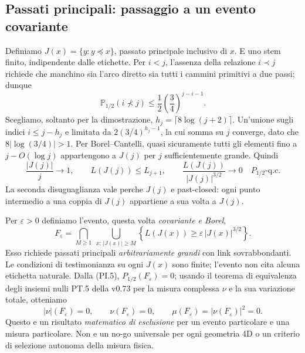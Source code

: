 \documentclass[11pt,a4paper]{article}
\begin{document}
\clearpage
\subsection*{Passati principali: passaggio a un evento covariante}
Definiamo $J(x)=\{y:y\preceq x\}$, passato principale inclusivo di $x$. E uno stem finito, indipendente dalle etichette. Per $i<j$, l'assenza della relazione $i\prec j$ richiede che manchino sia l'arco diretto sia tutti i cammini primitivi a due passi; dunque
\begin{equation}
\mathbb P_{1/2}(i\not\prec j)\le\frac12\left(\frac34\right)^{j-i-1}.
\tag{PI.4}
\end{equation}
Scegliamo, soltanto per la dimostrazione, $h_j=\lceil8\log(j+2)\rceil$. Un'unione sugli indici $i\le j-h_j$ e limitata da $2(3/4)^{h_j-1}$, la cui somma su $j$ converge, dato che $8|\log(3/4)|>1$. Per Borel--Cantelli, quasi sicuramente tutti gli elementi fino a $j-O(\log j)$ appartengono a $J(j)$ per $j$ sufficientemente grande. Quindi
\begin{equation}
\frac{|J(j)|}{j}\longrightarrow1,\qquad
L(J(j))\le L_{j+1},\qquad
\boxed{\frac{L(J(j))}{|J(j)|^{3/2}}\longrightarrow0\quad P_{1/2}\text{-q.c.}}
\tag{PI.5}
\end{equation}
La seconda disuguaglianza vale perche $J(j)$ e past-closed: ogni punto intermedio a una coppia di $J(j)$ appartiene a sua volta a $J(j)$.

Per $\varepsilon>0$ definiamo l'evento, questa volta \emph{covariante e Borel},
\begin{equation}
F_\varepsilon=\bigcap_{M\ge1}\ \bigcup_{x:\,|J(x)|\ge M}
\left\{L(J(x))\ge\varepsilon\,|J(x)|^{3/2}\right\}.
\tag{PI.6}
\end{equation}
Esso richiede passati principali \emph{arbitrariamente grandi} con link sovrabbondanti. Le condizioni di testimonianza su ogni $J(x)$ sono finite; l'evento non cita alcuna etichetta naturale. Dalla (PI.5), $P_{1/2}(F_\varepsilon)=0$; usando il teorema di equivalenza degli insiemi nulli PT.5 della v0.73 per la misura complessa $\nu$ e la sua variazione totale, otteniamo
\begin{equation}
\boxed{|\nu|(F_\varepsilon)=0,\qquad \nu(F_\varepsilon)=0,\qquad
\mu(F_\varepsilon)=|\nu(F_\varepsilon)|^2=0.}
\tag{PI.7}
\end{equation}
Questo e un risultato \emph{matematico di esclusione} per un evento particolare e una misura particolare. Non e un no-go universale per ogni geometria 4D o un criterio di selezione autonoma della misura fisica.
\end{document}
